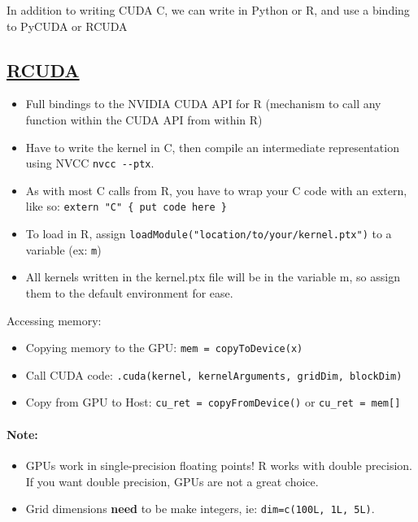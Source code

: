 \documentclass[12pt]{article}
\begin{document}
In addition to writing CUDA C, we can write in Python or R, and use a binding to PyCUDA or RCUDA

\subsection{\href{https://github.com/duncantl/RCUDA}{RCUDA}}
\begin{itemize}
\itemsep1pt\parskip0pt
\item Full bindings to the NVIDIA CUDA API for R (mechanism to call any function within the CUDA API from within R)
\item Have to write the kernel in C, then compile an intermediate representation using NVCC \texttt{nvcc -{}-ptx}.
\item As with most C calls from R, you have to wrap your C code with an extern, like so: \texttt{extern "C" \{ put code here \}}
\item To load in R, assign \texttt{loadModule("location/to/your/kernel.ptx")} to a variable (ex: \texttt{m})
\item All kernels written in the kernel.ptx file will be in the variable m, so assign them to the default environment for ease.
\end{itemize}

Accessing memory:

\begin{itemize}
\itemsep1pt\parskip0pt
\item Copying memory to the GPU: \texttt{mem = copyToDevice(x)}
\item Call CUDA code: \texttt{.cuda(kernel, kernelArguments, gridDim, blockDim)}
\item Copy from GPU to Host: \texttt{cu\_ret = copyFromDevice()} or \texttt{cu\_ret = mem{[}{]}}
\end{itemize}

\paragraph{Note:}
\begin{itemize}
\itemsep1pt\parskip0pt
\item GPUs work in single-precision floating points! R works with double precision. If you want double precision, GPUs are not a great choice.
\item Grid dimensions \textbf{need} to be make integers, ie: \texttt{dim=c(100L, 1L, 5L)}.
\end{itemize}
\end{document}
